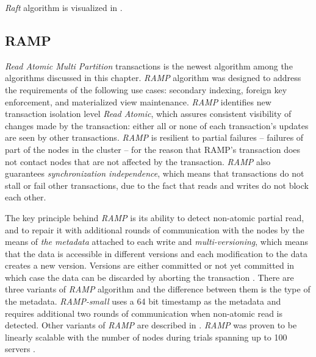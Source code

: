 \emph{Raft} algorithm is visualized in \cite{raftVisual}.

\subsection{RAMP}\label{sec:theory:transactions:ramp}
\emph{Read Atomic Multi Partition} transactions \cite{Bailis:2014} is the newest algorithm among the algorithms discussed in this chapter. 
\emph{RAMP} algorithm was designed to address the requirements of the following use cases: secondary indexing, foreign key
enforcement, and materialized view maintenance.
\emph{RAMP} identifies new transaction isolation level \emph{Read Atomic}, which 
assures consistent visibility of changes made by the transaction: either all or none of each transaction's updates are seen by other transactions.
\emph{RAMP} is resilient to partial failures -- failures of part of the nodes in the cluster -- for the reason that RAMP's transaction does not contact nodes that are not affected by the transaction. 
\emph{RAMP} also guarantees \emph{synchronization independence}, which means that transactions do not stall or fail other transactions, due to the fact that reads and writes do not block each other. 

The key principle behind \emph{RAMP} is its ability to detect non-atomic partial read, and to repair it with additional rounds of communication with the nodes by the means of \emph{the metadata} attached to each write and \emph{multi-versioning}, which means that the data is accessible in different versions and each modification to the data creates a new version. Versions are either committed or not yet committed in which case the data can be discarded by aborting the transaction \cite[p. 6]{Bailis:2014}. 
There are three variants of \emph{RAMP} algorithm and the difference between them is the type of the metadata. \emph{RAMP-small} uses a 64 bit timestamp as the metadata and requires additional two rounds of communication when non-atomic read is detected. Other variants of \emph{RAMP} are described in \cite[p. 5]{Bailis:2014}.
\emph{RAMP} was proven to be linearly scalable with the number of nodes during trials spanning up to 100 servers \cite[p. 10]{Bailis:2014}.
 


